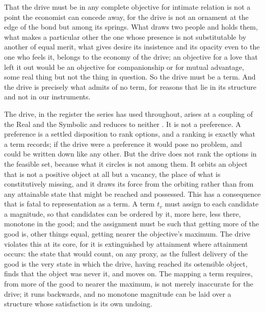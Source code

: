 That the drive must be in any complete objective for intimate relation is not a point the economist can concede away, for the drive is not an ornament at the edge of the bond but among its springs. What draws two people and holds them, what makes a particular other the one whose presence is not substitutable by another of equal merit, what gives desire its insistence and its opacity even to the one who feels it, belongs to the economy of the drive; an objective for a love that left it out would be an objective for companionship or for mutual advantage, some real thing but not the thing in question. So the drive must be a term. And the drive is precisely what admits of no term, for reasons that lie in its structure and not in our instruments.

The drive, in the register the series has used throughout, arises at a coupling of the Real and the Symbolic and reduces to neither \parencite{lacan1977xi,lacan1992vii}. It is not a preference. A preference is a settled disposition to rank options, and a ranking is exactly what a term records; if the drive were a preference it would pose no problem, and could be written down like any other. But the drive does not rank the options in the feasible set, because what it circles is not among them. It orbits an object that is not a positive object at all but a vacancy, the place of what is constitutively missing, and it draws its force from the orbiting rather than from any attainable state that might be reached and possessed. This has a consequence that is fatal to representation as a term. A term $t_v$ must assign to each candidate a magnitude, so that candidates can be ordered by it, more here, less there, monotone in the good; and the assignment must be such that getting more of the good is, other things equal, getting nearer the objective's maximum. The drive violates this at its core, for it is extinguished by attainment where attainment occurs: the state that would count, on any proxy, as the fullest delivery of the good is the very state in which the drive, having reached its ostensible object, finds that the object was never it, and moves on. The mapping a term requires, from more of the good to nearer the maximum, is not merely inaccurate for the drive; it runs backwards, and no monotone magnitude can be laid over a structure whose satisfaction is its own undoing.

